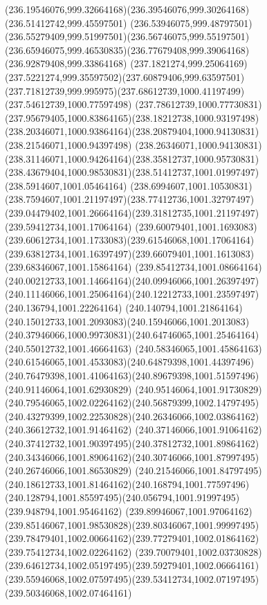 {{\curveto(236.19546076,999.32664168)(236.39546076,999.30264168)(236.51412742,999.45597501)
\curveto(236.53946075,999.48797501)(236.55279409,999.51997501)(236.56746075,999.55197501)
\curveto(236.65946075,999.46530835)(236.77679408,999.39064168)(236.92879408,999.33864168)
\curveto(237.1821274,999.25064169)(237.5221274,999.35597502)(237.60879406,999.63597501)
\curveto(237.71812739,999.995975)(237.68612739,1000.41197499)(237.54612739,1000.77597498)
\curveto(237.78612739,1000.77730831)(237.95679405,1000.83864165)(238.18212738,1000.93197498)
\curveto(238.20346071,1000.93864164)(238.20879404,1000.94130831)(238.21546071,1000.94397498)
\curveto(238.26346071,1000.94130831)(238.31146071,1000.94264164)(238.35812737,1000.95730831)
\curveto(238.43679404,1000.98530831)(238.51412737,1001.01997497)(238.5914607,1001.05464164)
\curveto(238.6994607,1001.10530831)(238.7594607,1001.21197497)(238.77412736,1001.32797497)
\curveto(239.04479402,1001.26664164)(239.31812735,1001.21197497)(239.59412734,1001.17064164)
\curveto(239.60079401,1001.1693083)(239.60612734,1001.1733083)(239.61546068,1001.17064164)
\curveto(239.63812734,1001.16397497)(239.66079401,1001.1613083)(239.68346067,1001.15864164)
\curveto(239.85412734,1001.08664164)(240.00212733,1001.14664164)(240.09946066,1001.26397497)
\curveto(240.11146066,1001.25064164)(240.12212733,1001.23597497)(240.136794,1001.22264164)
\curveto(240.140794,1001.21864164)(240.15012733,1001.2093083)(240.15946066,1001.2013083)
\curveto(240.37946066,1000.99730831)(240.64746065,1001.25464164)(240.55012732,1001.46664163)
\curveto(240.58346065,1001.45864163)(240.61546065,1001.4533083)(240.64879398,1001.44397496)
\curveto(240.76479398,1001.41064163)(240.89679398,1001.51597496)(240.91146064,1001.62930829)
\curveto(240.95146064,1001.91730829)(240.79546065,1002.02264162)(240.56879399,1002.14797495)
\curveto(240.43279399,1002.22530828)(240.26346066,1002.03864162)(240.36612732,1001.91464162)
\curveto(240.37146066,1001.91064162)(240.37412732,1001.90397495)(240.37812732,1001.89864162)
\curveto(240.34346066,1001.89064162)(240.30746066,1001.87997495)(240.26746066,1001.86530829)
\curveto(240.21546066,1001.84797495)(240.18612733,1001.81464162)(240.168794,1001.77597496)
\curveto(240.128794,1001.85597495)(240.056794,1001.91997495)(239.948794,1001.95464162)
\curveto(239.89946067,1001.97064162)(239.85146067,1001.98530828)(239.80346067,1001.99997495)
\curveto(239.78479401,1002.00664162)(239.77279401,1002.01864162)(239.75412734,1002.02264162)
\curveto(239.70079401,1002.03730828)(239.64612734,1002.05197495)(239.59279401,1002.06664161)
\curveto(239.55946068,1002.07597495)(239.53412734,1002.07197495)(239.50346068,1002.07464161)
}}
